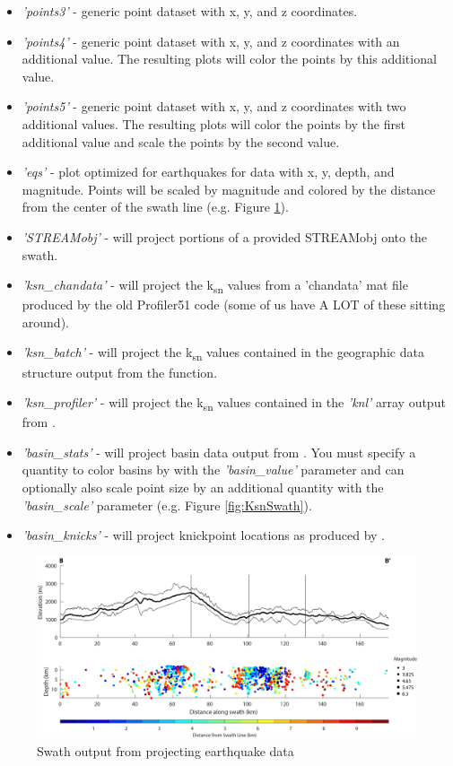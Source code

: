 \begin{itemize}
	\item \textit{'points3'} - generic point dataset with x, y, and z coordinates.
	\item \textit{'points4'} - generic point dataset with x, y, and z coordinates with an additional value. The resulting plots will color the points by this additional value.
	\item \textit{'points5'} - generic point dataset with x, y, and z coordinates with two additional values. The resulting plots will color the points by the first additional value and scale the points by the second value.
	\item \textit{'eqs'} - plot optimized for earthquakes for data with x, y, depth, and magnitude. Points will be scaled by magnitude and colored by the distance from the center of the swath line (e.g. Figure \ref{fig:EqSwath}).
	\item \textit{'STREAMobj'} - will project portions of a provided STREAMobj onto the swath.
	\item \textit{'ksn\_chandata'} - will project the k\textsubscript{sn} values from a 'chandata' mat file produced by the old Profiler51 code (some of us have A LOT of these sitting around).
	\item \textit{'ksn\_batch'} - will project the k\textsubscript{sn} values contained in the geographic data structure output from the  function.
	\item \textit{'ksn\_profiler'} - will project the k\textsubscript{sn} values contained in the \textit{'knl'} array output from .
	\item \textit{'basin\_stats'} - will project basin data output from . You must specify a quantity to color basins by with the \textit{'basin\_value'} parameter and can optionally also scale point size by an additional quantity with the \textit{'basin\_scale'} parameter (e.g. Figure \ref{fig:KsnSwath}).
	\item \textit{'basin\_knicks'} - will project knickpoint locations as produced by .
\end{itemize}

\begin{figure}[H]
	\centering
	\includegraphics[width=16.5cm]{PNGs/SanBern_EQSwath.png}
	\caption{Swath output from  projecting earthquake data}
	\label{fig:EqSwath}
\end{figure}


